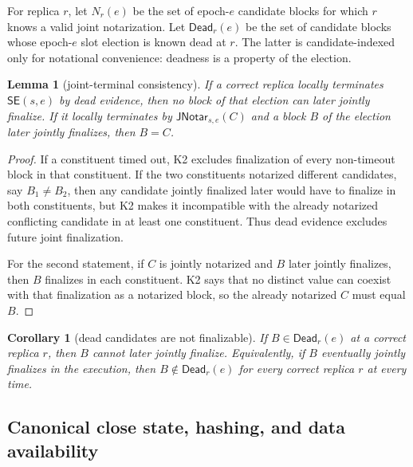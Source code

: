\documentclass[11pt]{article}
\newtheorem{lemma}[theorem]{Lemma}
\newtheorem{corollary}[theorem]{Corollary}
\theoremstyle{definition}
\theoremstyle{remark}
\newcommand{\SE}{\mathsf{SE}}
\newcommand{\JNotar}{\mathsf{JNotar}}
\newcommand{\Dead}{\mathsf{Dead}}
\begin{document}
For replica $r$, let $N_r(e)$ be the set of epoch-$e$ candidate blocks for which $r$ knows a valid joint notarization. Let $\Dead_r(e)$ be the set of candidate blocks whose epoch-$e$ slot election is known dead at $r$. The latter is candidate-indexed only for notational convenience: deadness is a property of the election.

\begin{lemma}[joint-terminal consistency]
\label{lem:joint-terminal}
If a correct replica locally terminates $\SE(s,e)$ by dead evidence, then no block of that election can later jointly finalize. If it locally terminates by $\JNotar_{s,e}(C)$ and a block $B$ of the election later jointly finalizes, then $B=C$.
\end{lemma}

\begin{proof}
If a constituent timed out, K2 excludes finalization of every non-timeout block in that constituent. If the two constituents notarized different candidates, say $B_1\ne B_2$, then any candidate jointly finalized later would have to finalize in both constituents, but K2 makes it incompatible with the already notarized conflicting candidate in at least one constituent. Thus dead evidence excludes future joint finalization.

For the second statement, if $C$ is jointly notarized and $B$ later jointly finalizes, then $B$ finalizes in each constituent. K2 says that no distinct value can coexist with that finalization as a notarized block, so the already notarized $C$ must equal $B$.
\end{proof}

\begin{corollary}[dead candidates are not finalizable]
\label{cor:droppable}
If $B\in\Dead_r(e)$ at a correct replica $r$, then $B$ cannot later jointly finalize. Equivalently, if $B$ eventually jointly finalizes in the execution, then $B\notin\Dead_r(e)$ for every correct replica $r$ at every time.
\end{corollary}

\subsection{Canonical close state, hashing, and data availability}
\end{document}
